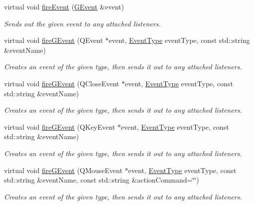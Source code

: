 \begin{DoxyCompactItemize}
virtual void \mbox{\hyperlink{classsgl_1_1GObservable_a63e5e5a6227c59c928493b11aceb0f67}{fire\+Event}} (\mbox{\hyperlink{classsgl_1_1GEvent}{G\+Event}} \&event)
\begin{DoxyCompactList}\small\item\em Sends out the given event to any attached listeners. \end{DoxyCompactList}\item 
virtual void \mbox{\hyperlink{classsgl_1_1GObservable_ab3983ea07337b52020a29cc00c653d8d}{fire\+G\+Event}} (Q\+Event $\ast$event, \mbox{\hyperlink{namespacesgl_a2628ea8d12e8b2563c32f05dc7fff6fa}{Event\+Type}} event\+Type, const std\+::string \&event\+Name)
\begin{DoxyCompactList}\small\item\em Creates an event of the given type, then sends it out to any attached listeners. \end{DoxyCompactList}\item 
virtual void \mbox{\hyperlink{classsgl_1_1GObservable_a01fdf1b0e0dbd49e189fe4514e010411}{fire\+G\+Event}} (Q\+Close\+Event $\ast$event, \mbox{\hyperlink{namespacesgl_a2628ea8d12e8b2563c32f05dc7fff6fa}{Event\+Type}} event\+Type, const std\+::string \&event\+Name)
\begin{DoxyCompactList}\small\item\em Creates an event of the given type, then sends it out to any attached listeners. \end{DoxyCompactList}\item 
virtual void \mbox{\hyperlink{classsgl_1_1GObservable_abb0b2f66ba39211cb5d7615e9d1c04e2}{fire\+G\+Event}} (Q\+Key\+Event $\ast$event, \mbox{\hyperlink{namespacesgl_a2628ea8d12e8b2563c32f05dc7fff6fa}{Event\+Type}} event\+Type, const std\+::string \&event\+Name)
\begin{DoxyCompactList}\small\item\em Creates an event of the given type, then sends it out to any attached listeners. \end{DoxyCompactList}\item 
virtual void \mbox{\hyperlink{classsgl_1_1GObservable_a119318675d2165bdf7dd853aaf881d4b}{fire\+G\+Event}} (Q\+Mouse\+Event $\ast$event, \mbox{\hyperlink{namespacesgl_a2628ea8d12e8b2563c32f05dc7fff6fa}{Event\+Type}} event\+Type, const std\+::string \&event\+Name, const std\+::string \&action\+Command=\char`\"{}\char`\"{})
\begin{DoxyCompactList}\small\item\em Creates an event of the given type, then sends it out to any attached listeners. \end{DoxyCompactList}\item 

\end{DoxyCompactItemize}
